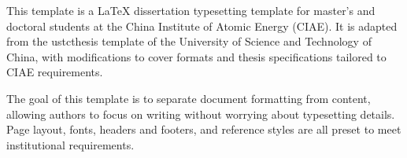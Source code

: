 \begin{abstract}

本模板是面向中国原子能科学研究院（CIAE）硕士、博士研究生的学位论文 \LaTeX{} 排版模板，
基于中国科学技术大学论文模板（ustcthesis）修改而来，
在保留原模板完善排版功能的基础上，针对原子能院的封面格式与论文规范进行了适配。

本模板的目标是将论文格式与论文内容分离，
使作者专注于论文内容的写作，而无需过多关注排版细节。
模板已预设符合学院要求的页面尺寸、字体字号、页眉页脚、参考文献格式等，
开箱即用，按照各章注释提示填写内容即可。


\end{abstract}

\begin{enabstract}

This template is a \LaTeX{} dissertation typesetting template for master's and doctoral
students at the China Institute of Atomic Energy (CIAE).
It is adapted from the ustcthesis template of the University of Science and Technology of China,
with modifications to cover formats and thesis specifications tailored to CIAE requirements.

The goal of this template is to separate document formatting from content,
allowing authors to focus on writing without worrying about typesetting details.
Page layout, fonts, headers and footers, and reference styles are all preset
to meet institutional requirements.


\end{enabstract}
